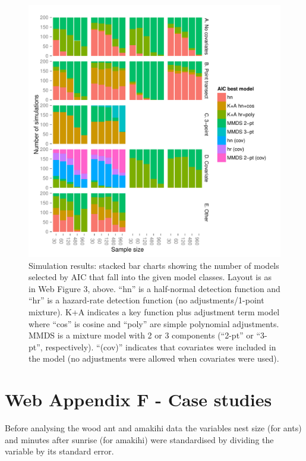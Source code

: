 \documentclass[10pt]{article}
\begin{document}
\begin{figure}[H]
\centering
\includegraphics[width=\textwidth]{simulations/bar-winners.pdf}
\caption{Simulation results: stacked bar charts showing the number of models selected by AIC that fall into the given model classes. Layout is as in Web Figure 3, above. ``hn'' is a half-normal detection function and ``hr'' is a hazard-rate detection function (no adjustments/1-point mixture). K+A indicates a key function plus adjustment term model where ``cos'' is cosine and ``poly'' are simple polynomial adjustments. MMDS is a mixture model with 2 or 3 components (``2-pt'' or ``3-pt'', respectively). ``(cov)'' indicates that covariates were included in the model (no adjustments were allowed when covariates were used).}
\label{sim-barplot}
\end{figure}


\newpage
\section*{Web Appendix F - Case studies}

Before analysing the wood ant and amakihi data the variables nest size (for ants) and minutes after sunrise (for amakihi) were standardised by dividing the variable by its standard error. 
\end{document}
